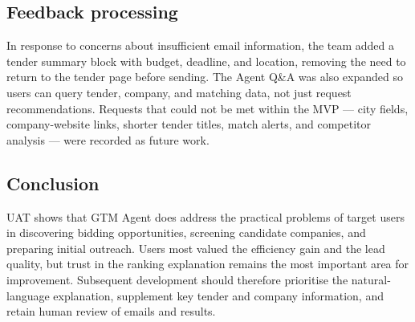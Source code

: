 \subsection{Feedback processing}
In response to concerns about insufficient email information, the team added a tender
summary block with budget, deadline, and location, removing the need to return to the
tender page before sending. The Agent Q\&A was also expanded so users can query tender,
company, and matching data, not just request recommendations. Requests that could not
be met within the MVP --- city fields, company-website links, shorter tender titles,
match alerts, and competitor analysis --- were recorded as future work.

\subsection{Conclusion}
UAT shows that GTM Agent does address the practical problems of target users in
discovering bidding opportunities, screening candidate companies, and preparing initial
outreach. Users most valued the efficiency gain and the lead quality, but trust in the
ranking explanation remains the most important area for improvement. Subsequent
development should therefore prioritise the natural-language explanation, supplement
key tender and company information, and retain human review of emails and results.
